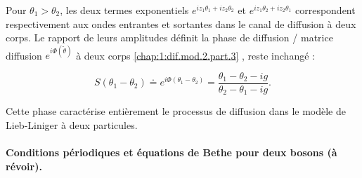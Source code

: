 

Pour \(\theta_1 > \theta_2\), les deux termes exponentiels 
\(e^{i z_1 \theta_1 + i z_2 \theta_2}\) et \(e^{i z_1 \theta_2 + i z_2 \theta_1}\)
correspondent respectivement aux ondes entrantes et sortantes dans le canal de diffusion à deux corps.  
Le rapport de leurs amplitudes définit la phase de diffusion / matrice diffusion $e^{i\Phi ( \tilde{\theta}  ) }$  à deux corps \eqref{chap:1:dif.mod.2.part.3} , reste inchangé :

\begin{equation}\label{chap:1:dif.mod.2.part.4}
	S(\theta_1- \theta_2) \doteq e^{i\Phi(\theta_1 - \theta_2)} 
	= \frac{\theta_1 - \theta_2 - ig}{\theta_2 - \theta_1 - ig}.
\end{equation}

Cette phase caractérise entièrement le processus de diffusion dans le modèle de Lieb-Liniger à deux particules.

\paragraph{Conditions périodiques et équations de Bethe pour deux bosons {\color{red}(à révoir)}.}




